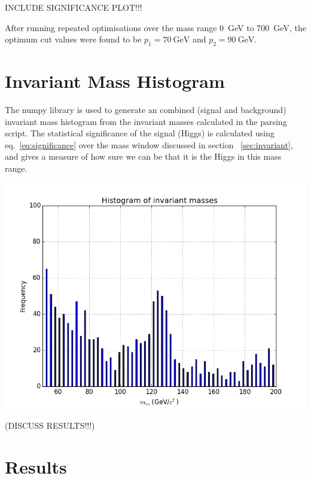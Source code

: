 \documentclass[11pt]{amsart}
\newenvironment{Figure}
  {\par\medskip\noindent\minipage{\linewidth}}
  {\endminipage\par\medskip}
\begin{document}
\begin{multicols}{2}
INCLUDE SIGNIFICANCE PLOT!!!

After running repeated optimisations over the mass range \SI{0}{\giga\electronvolt} to \SI{700}{\giga\electronvolt}, the optimum cut values were found to be $p_1 = \SI{70}{\giga\electronvolt}$ and $p_2 = \SI{90}{\giga\electronvolt}$.

\section{Invariant Mass Histogram}

The numpy library is used to generate an combined (signal and background) invariant mass histogram from the invariant masses calculated in the parsing script. The statistical significance of the signal (Higgs) is calculated using eq.~\ref{eq:significance} over the mass window discussed in section ~\ref{sec:invariant}, and gives a measure of how sure we can be that it is the Higgs in this mass range.

\begin{Figure}
  \centering
  \includegraphics[width=\linewidth]{invmass2}
  \label{fig:invmass}
\end{Figure}

(DISCUSS RESULTS!!!)

\section{Results}

\end{multicols}



\end{document}
